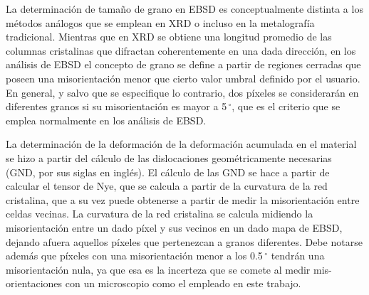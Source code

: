 La determinación de tamaño de grano en EBSD es conceptualmente distinta a los métodos análogos que se emplean en XRD o incluso en la metalografía tradicional.
Mientras que en XRD se obtiene una longitud promedio de las columnas cristalinas que difractan coherentemente en una dada dirección, en los análisis de EBSD el concepto de grano se define a partir de regiones cerradas que poseen una misorientación menor que cierto valor umbral definido por el usuario.
En general, y salvo que se especifique lo contrario, dos píxeles se considerarán en diferentes granos si su misorientación es mayor a 5\,$^{\circ}$, que es el criterio que se emplea normalmente en los análisis de EBSD.

La determinación de la deformación de la deformación acumulada en el material se hizo a partir del cálculo de las dislocaciones geométricamente necesarias (GND, por sus siglas en inglés).
El cálculo de las GND se hace a partir de calcular el tensor de Nye\cite{Nye1953}, que se calcula a partir de la curvatura de la red cristalina, que a su vez puede obtenerse a partir de medir la misorientación entre celdas vecinas\cite{Pantleon2008}.
La curvatura de la red cristalina se calcula midiendo la misorientación entre un dado píxel y sus vecinos en un dado mapa de EBSD, dejando afuera aquellos píxeles que pertenezcan a granos diferentes.
Debe notarse además que píxeles con una misorientación menor a los 0.5\,$^{\circ}$ tendrán una misorientación nula, ya que esa es la incerteza que se comete al medir mis-orientaciones con un microscopio como el empleado en este trabajo.
